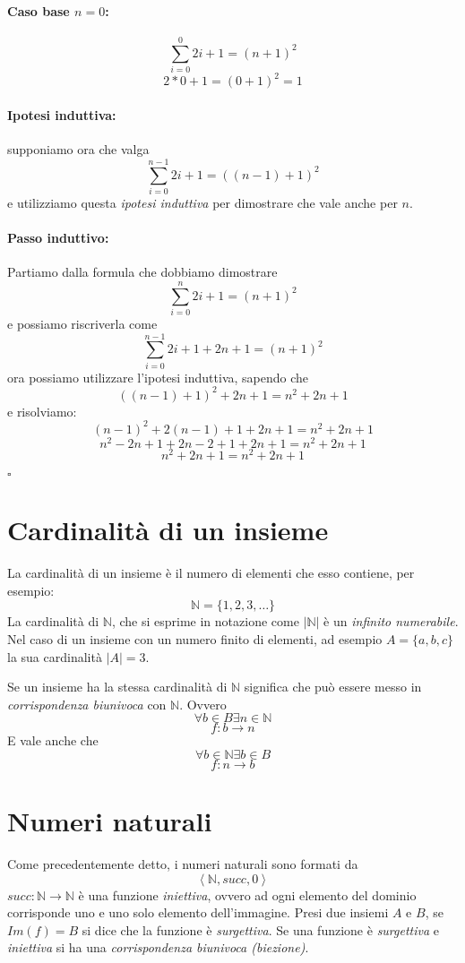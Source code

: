 \documentclass[a4paper,12pt]{report}
\begin{document}
\paragraph{Caso base $n=0$:}
\[ \sum_{i=0}^{0} 2i+1 = (n+1)^2 \]
\[ 2*0+1 = (0 + 1)^2 = 1 \]

\paragraph{Ipotesi induttiva:} supponiamo ora che valga 
\[ \sum_{i=0}^{n-1} 2i+1 = ((n-1)+1)^2 \]
e utilizziamo questa \emph{ipotesi induttiva} per dimostrare che vale anche per $n$.

\paragraph{Passo induttivo:}

Partiamo dalla formula che dobbiamo dimostrare 
\[ \sum_{i=0}^{n}2i+1 = (n+1)^2 \]
e possiamo riscriverla come
\[ \sum_{i=0}^{n-1} 2i+1 + 2n+1 = (n+1)^2 \]
ora possiamo utilizzare l'ipotesi induttiva, sapendo che 
\[ ((n-1)+1)^2 + 2n+1 = n^2 + 2n + 1 \]
e risolviamo:
\[ (n-1)^2 + 2(n-1) + 1 + 2n + 1 = n^2+2n+1 \] 
\[ n^2-2n+1+2n-2+1+2n+1 = n^2+2n+1 \]
\[ n^2+2n+1 = n^2+2n+1 \]
\begin{flushright}{$\square$}\end{flushright}


\section{Cardinalit\`{a} di un insieme}
La cardinalit\`{a} di un insieme \`{e} il numero di elementi che esso contiene, per esempio:
\[ \mathbb{N} = \{ 1, 2, 3, \dots \} \]
La cardinalit\`{a} di $\mathbb{N}$, che si esprime in notazione come $|\mathbb{N}|$ \`{e} un \emph{infinito numerabile}.
Nel caso di un insieme con un numero finito di elementi, ad esempio $A = \{a, b, c \}$ la sua cardinalit\`{a} $|A| = 3$.

Se un insieme ha la stessa cardinalit\`{a} di $\mathbb{N}$ significa che pu\`{o} essere messo in \emph{corrispondenza biunivoca} con $\mathbb{N}$.
Ovvero 
\[ \forall b\in B \exists n \in \mathbb{N} \]
\[ f: b \rightarrow n \]
E vale anche che
\[ \forall b \in \mathbb{N} \exists b \in B \]
\[ f: n \rightarrow b \]

\section{Numeri naturali}
Come precedentemente detto, i numeri naturali sono formati da
\[ \left<\mathbb{N}, succ, 0\right> \]
$succ: \mathbb{N} \rightarrow \mathbb{N}$ \`{e} una funzione \emph{iniettiva}, ovvero ad ogni elemento del dominio corrisponde uno e uno solo elemento dell'immagine. 
Presi due insiemi $A$ e $B$, se $Im(f) = B$ si dice che la funzione \`{e} \emph{surgettiva}. 
Se una funzione \`{e} \emph{surgettiva} e \emph{iniettiva} si ha una \emph{corrispondenza biunivoca (biezione)}.
\end{document}

